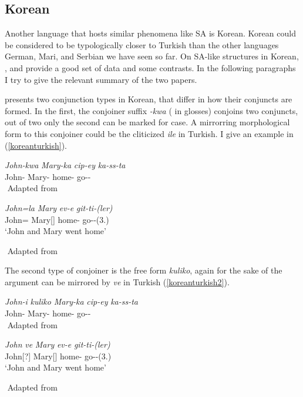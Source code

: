 \subsection{Korean}

Another language that hosts similar phenomena like SA is Korean. Korean could be considered to be typologically closer to Turkish than the other languages German, Mari, and Serbian we have seen so far. On SA-like structures in Korean, \cite{yoon2005conjunction}, and \cite{yoon2017lexical} provide a good set of data and some contrasts. In the following paragraphs I try to give the relevant summary of the two papers.

\cite{yoon2005conjunction} presents two conjunction types in Korean, that differ in how their conjuncts are formed. In the first, the conjoiner suffix \textit{-kwa} ({\Conj} in glosses) conjoins two conjuncts, out of two only the second can be marked for case. A mirrorring morphological form to this conjoiner could be the cliticized \textit{ile} in Turkish. I give an example in (\ref{koreanturkish}).

\begin{exe}
    \ex \label{koreanturkish}
    \begin{xlist}
        \ex
        \gll 
        \textit{John-kwa} \textit{Mary-ka} \textit{cip-ey} \textit{ka-ss-ta} \\ John-{\Conj} Mary-{\Nom} home-{\Loc} go-{\Pst}-{\Decl} \\
        ${}$ \hfill Adapted from \cite{yoon2005conjunction}

        \ex 
        \gll 
        \textit{John=la} \textit{Mary} \textit{ev-e} \textit{git-ti-(ler)} \\ John={\And} Mary[{\Nom}] home-{\Dat} go-{\Pst}-(3.{\Pl}) \\
        \glt `John and Mary went home'
    \end{xlist}
    ${}$ \hfill Adapted from \cite{yoon2005conjunction}
\end{exe}

The second type of conjoiner is the free form \textit{kuliko}, again for the sake of the argument can be mirrored by \textit{ve} in Turkish (\ref{koreanturkish2}).

\begin{exe}
    \ex \label{koreanturkish2}
    \begin{xlist}
        \ex 
        \gll 
        \textit{John-i} \textit{kuliko} \textit{Mary-ka} \textit{cip-ey} \textit{ka-ss-ta} \\ John-{\Nom} {\And} Mary-{\Nom} home-{\Loc} go-{\Pst}-{\Decl} \\
        ${}$ \hfill Adapted from \cite{yoon2005conjunction}
        
        \ex 
        \gll 
        \textit{John} \textit{ve} \textit{Mary} \textit{ev-e} \textit{git-ti-(ler)} \\ John[?{\Nom}] {\And} Mary[{\Nom}] home-{\Dat} go-{\Pst}-(3.{\Pl}) \\
        \glt `John and Mary went home'
    \end{xlist}
    ${}$ \hfill Adapted from \cite{yoon2005conjunction}
\end{exe}

